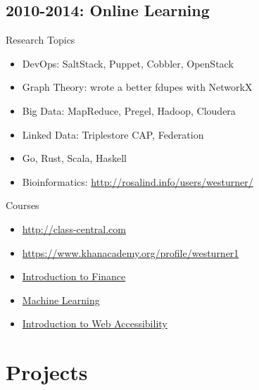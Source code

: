 \documentclass[letter,,openany,oneside]{sphinxhowto}
\begin{document}
\subsection{2010-2014: Online Learning}
\label{resume:nebraska-humane-society-nonprofit-consulting}\label{resume:online-learning}\label{resume:id2}
Research Topics
\begin{itemize}
\item {} 
DevOps: SaltStack, Puppet, Cobbler, OpenStack

\item {} 
Graph Theory: wrote a better fdupes with NetworkX

\item {} 
Big Data: MapReduce, Pregel, Hadoop, Cloudera

\item {} 
Linked Data: Triplestore CAP, Federation

\item {} 
Go, Rust, Scala, Haskell

\item {} 
Bioinformatics: \href{http://rosalind.info/users/westurner/}{http://rosalind.info/users/westurner/}

\end{itemize}

Courses
\begin{itemize}
\item {} 
\href{http://class-central.com}{http://class-central.com}

\item {} 
\href{https://www.khanacademy.org/profile/westurner1}{https://www.khanacademy.org/profile/westurner1}

\item {} 
\href{https://www.coursera.org/course/introfinance}{Introduction to Finance}

\item {} 
\href{https://www.coursera.org/course/ml}{Machine Learning}

\item {} 
\href{https://webaccessibility.withgoogle.com/course}{Introduction to Web Accessibility}

\end{itemize}


\section{Projects}
\label{resume:projects}
\end{document}
